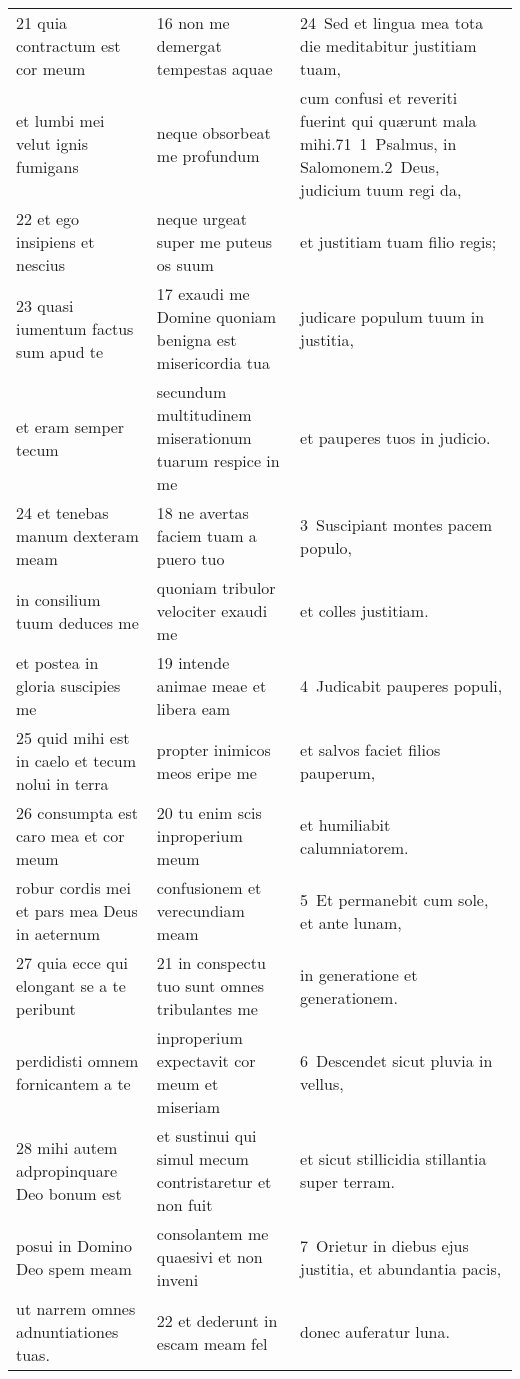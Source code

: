 \documentclass{article}
\begin{document}
\begin{longtable}{@{}p{}p{}p{}@{}}
21 quia contractum est cor meum	&	16 non me demergat tempestas aquae	&	24 Sed et lingua mea tota die meditabitur justitiam tuam,	\\
et lumbi mei velut ignis fumigans	&	neque obsorbeat me profundum	&	cum confusi et reveriti fuerint qui quærunt mala mihi.71 1 Psalmus, in Salomonem.2 Deus, judicium tuum regi da,	\\
22 et ego insipiens et nescius	&	neque urgeat super me puteus os suum	&	et justitiam tuam filio regis;	\\
23 quasi iumentum factus sum apud te	&	17 exaudi me Domine quoniam benigna est misericordia tua	&	judicare populum tuum in justitia,	\\
et eram semper tecum	&	secundum multitudinem miserationum tuarum respice in me	&	et pauperes tuos in judicio.	\\
24 et tenebas manum dexteram meam	&	18 ne avertas faciem tuam a puero tuo	&	3 Suscipiant montes pacem populo,	\\
in consilium tuum deduces me	&	quoniam tribulor velociter exaudi me	&	et colles justitiam.	\\
et postea in gloria suscipies me	&	19 intende animae meae et libera eam	&	4 Judicabit pauperes populi,	\\
25 quid mihi est in caelo et tecum nolui in terra	&	propter inimicos meos eripe me	&	et salvos faciet filios pauperum,	\\
26 consumpta est caro mea et cor meum	&	20 tu enim scis inproperium meum	&	et humiliabit calumniatorem.	\\
robur cordis mei et pars mea Deus in aeternum	&	confusionem et verecundiam meam	&	5 Et permanebit cum sole, et ante lunam,	\\
27 quia ecce qui elongant se a te peribunt	&	21 in conspectu tuo sunt omnes tribulantes me	&	in generatione et generationem.	\\
perdidisti omnem fornicantem a te	&	inproperium expectavit cor meum et miseriam	&	6 Descendet sicut pluvia in vellus,	\\
28 mihi autem adpropinquare Deo bonum est	&	et sustinui qui simul mecum contristaretur et non fuit	&	et sicut stillicidia stillantia super terram.	\\
posui in Domino Deo spem meam	&	consolantem me quaesivi et non inveni	&	7 Orietur in diebus ejus justitia, et abundantia pacis,	\\
ut narrem omnes adnuntiationes tuas.	&	22 et dederunt in escam meam fel	&	donec auferatur luna.	\\

\end{longtable}
\end{document}
